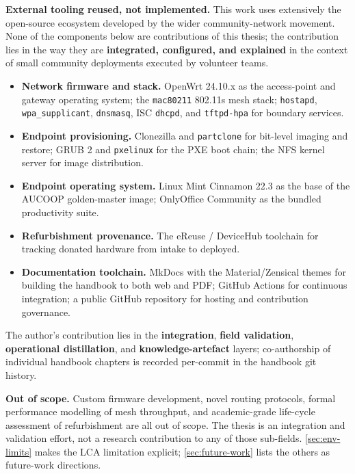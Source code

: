 \textbf{External tooling reused, not implemented.} This work uses
extensively the open-source ecosystem developed by the wider
community-network movement. None of the components below are
contributions of this thesis; the contribution lies in the way they are
\textbf{integrated, configured, and explained} in the context of small
community deployments executed by volunteer teams.

\begin{itemize}
\tightlist
\item
  \textbf{Network firmware and stack.} OpenWrt 24.10.x as the
  access-point and gateway operating system; the \texttt{mac80211}
  802.11s mesh stack; \texttt{hostapd}, \texttt{wpa\_supplicant},
  \texttt{dnsmasq}, ISC \texttt{dhcpd}, and \texttt{tftpd-hpa} for
  boundary services.
\item
  \textbf{Endpoint provisioning.} Clonezilla and \texttt{partclone} for
  bit-level imaging and restore; GRUB 2 and \texttt{pxelinux} for the
  PXE boot chain; the NFS kernel server for image distribution.
\item
  \textbf{Endpoint operating system.} Linux Mint Cinnamon 22.3 as the
  base of the AUCOOP golden-master image; OnlyOffice Community as the
  bundled productivity suite.
\item
  \textbf{Refurbishment provenance.} The eReuse / DeviceHub toolchain
  for tracking donated hardware from intake to deployed.
\item
  \textbf{Documentation toolchain.} MkDocs with the Material/Zensical
  themes for building the handbook to both web and PDF; GitHub Actions
  for continuous integration; a public GitHub repository for hosting and
  contribution governance.
\end{itemize}

The author's contribution lies in the \textbf{integration},
\textbf{field validation}, \textbf{operational distillation}, and
\textbf{knowledge-artefact} layers; co-authorship of individual handbook
chapters is recorded per-commit in the handbook git history.

\textbf{Out of scope.} Custom firmware development, novel routing
protocols, formal performance modelling of mesh throughput, and
academic-grade life-cycle assessment of refurbishment are all out of
scope. The thesis is an integration and validation effort, not a
research contribution to any of those sub-fields.
\autoref{sec:env-limits} makes the LCA limitation explicit;
\autoref{sec:future-work} lists the others as future-work directions.

